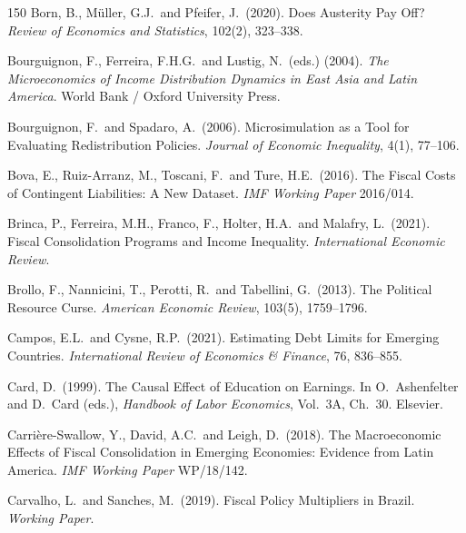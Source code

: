 \documentclass[11pt,a4paper]{article}
\begin{document}
\begin{thebibliography}{150}
 Born, B., M\"uller, G.J.\ and Pfeifer, J.\ (2020). Does Austerity Pay Off? \textit{Review of Economics and Statistics}, 102(2), 323--338.

 Bourguignon, F., Ferreira, F.H.G.\ and Lustig, N.\ (eds.) (2004). \textit{The Microeconomics of Income Distribution Dynamics in East Asia and Latin America}. World Bank / Oxford University Press.

 Bourguignon, F.\ and Spadaro, A.\ (2006). Microsimulation as a Tool for Evaluating Redistribution Policies. \textit{Journal of Economic Inequality}, 4(1), 77--106.

 Bova, E., Ruiz-Arranz, M., Toscani, F.\ and Ture, H.E.\ (2016). The Fiscal Costs of Contingent Liabilities: A New Dataset. \textit{IMF Working Paper} 2016/014.

 Brinca, P., Ferreira, M.H., Franco, F., Holter, H.A.\ and Malafry, L.\ (2021). Fiscal Consolidation Programs and Income Inequality. \textit{International Economic Review}.

 Brollo, F., Nannicini, T., Perotti, R.\ and Tabellini, G.\ (2013). The Political Resource Curse. \textit{American Economic Review}, 103(5), 1759--1796.

 Campos, E.L.\ and Cysne, R.P.\ (2021). Estimating Debt Limits for Emerging Countries. \textit{International Review of Economics \& Finance}, 76, 836--855.

 Card, D.\ (1999). The Causal Effect of Education on Earnings. In O.\ Ashenfelter and D.\ Card (eds.), \textit{Handbook of Labor Economics}, Vol.\ 3A, Ch.\ 30. Elsevier.

 Carri\`ere-Swallow, Y., David, A.C.\ and Leigh, D.\ (2018). The Macroeconomic Effects of Fiscal Consolidation in Emerging Economies: Evidence from Latin America. \textit{IMF Working Paper} WP/18/142.

 Carvalho, L.\ and Sanches, M.\ (2019). Fiscal Policy Multipliers in Brazil. \textit{Working Paper}.


\end{thebibliography}
\end{document}

